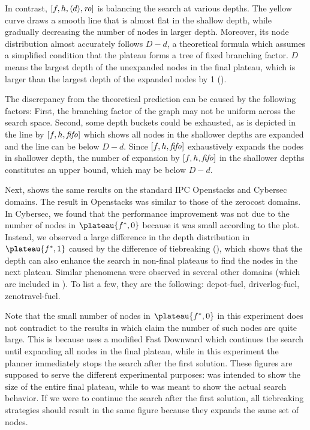 In contrast, $[f,h,{\left<d\right>},{\text{\textit{ro}}}]$ is balancing the search at various depths.
The yellow curve draws a smooth line that is almost flat in the shallow depth, while gradually decreasing the number of nodes in larger depth.
Moreover, its node distribution almost accurately follows $D-d$, a theoretical formula which assumes a simplified
condition that the plateau forms a tree of fixed branching factor.
$D$ means the largest depth of the unexpanded nodes in the final plateau, which is
larger than the largest depth of the expanded nodes by 1
().

The discrepancy from the theoretical prediction can be caused by the 
following factors: First, the branching factor of the graph may not be
uniform across the search space. Second, some depth buckets could be
exhausted, as is depicted in the line by $[f,h,{\text{\textit{fifo}}}]$ which
shows all nodes in the shallower depths are expanded and the line can be below $D-d$.
Since $[f,h,{\text{\textit{fifo}}}]$ exhaustively expands the nodes in shallower depth,
the number of expansion by $[f,h,{\text{\textit{fifo}}}]$ in the shallower depths constitutes an upper bound, which may be below $D-d$.

Next,  shows the same results on the standard IPC
Openstacks and Cybersec domains.
The result in Openstacks was similar to those of the zerocost domains.
In Cybersec,
we found that the performance improvement was not due to the number of nodes in $\plateau{f^*,0}$ because it was small according to the plot.
Instead, we observed a large difference in the depth distribution in $\plateau{f^*,1}$ caused by the difference of tiebreaking (), which shows that the depth can also enhance the search in non-final plateaus to find the nodes in the next plateau.
Similar phenomena were observed in several other domains (which are included in ). To list a few, they are the following: depot-fuel, driverlog-fuel, zenotravel-fuel.

Note that the small number of nodes in $\plateau{f^*,0}$ in this experiment does not contradict to the results in  which claim the number of such nodes are quite large.
This is because  uses a modified Fast Downward which continues the search until expanding all nodes in the final plateau, while in this experiment the planner immediately stops the search after the first solution. These figures are supposed to serve the different experimental purposes:  was intended to show the size of the entire final plateau, while  to  was meant to show the actual search behavior. If we were to continue the search after the first solution, all tiebreaking strategies should result in the same figure because they expands the same set of nodes.

